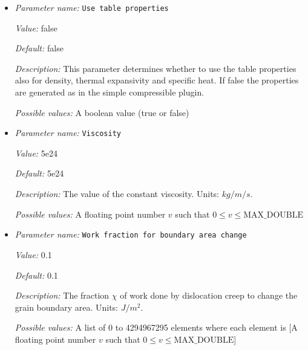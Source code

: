 \begin{itemize}
{\it Value:} true


{\it Default:} true


{\it Description:} A flag indicating whether the computation should be use the paleowattmeter approach of Austin and Evans (2007) for grain size reduction in the dislocation creep regime (if true) or the paleopiezometer approach from Hall and Parmetier (2003) (if false).


{\it Possible values:} A boolean value (true or false)
\item {\it Parameter name:} {\tt Use table properties}
\label{parameters:Material model/Grain size model/Use table properties}


{\it Value:} false


{\it Default:} false


{\it Description:} This parameter determines whether to use the table properties also for density, thermal expansivity and specific heat. If false the properties are generated as in the simple compressible plugin.


{\it Possible values:} A boolean value (true or false)
\item {\it Parameter name:} {\tt Viscosity}
\label{parameters:Material model/Grain size model/Viscosity}


{\it Value:} 5e24


{\it Default:} 5e24


{\it Description:} The value of the constant viscosity. Units: $kg/m/s$.


{\it Possible values:} A floating point number $v$ such that $0 \leq v \leq \text{MAX\_DOUBLE}$
\item {\it Parameter name:} {\tt Work fraction for boundary area change}
\label{parameters:Material model/Grain size model/Work fraction for boundary area change}


{\it Value:} 0.1


{\it Default:} 0.1


{\it Description:} The fraction $\chi$ of work done by dislocation creep to change the grain boundary area. Units: $J/m^2$.


{\it Possible values:} A list of 0 to 4294967295 elements where each element is [A floating point number $v$ such that $0 \leq v \leq \text{MAX\_DOUBLE}$]
\end{itemize}

